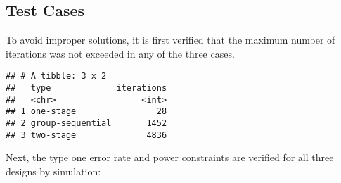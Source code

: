 \documentclass[
]{book}
\newenvironment{Shaded}{\begin{snugshade}}{\end{snugshade}}
\newcommand{\DataTypeTok}[1]{\textcolor[rgb]{0.13,0.29,0.53}{#1}}
\newcommand{\KeywordTok}[1]{\textcolor[rgb]{0.13,0.29,0.53}{\textbf{#1}}}
\newcommand{\NormalTok}[1]{#1}
\newcommand{\OperatorTok}[1]{\textcolor[rgb]{0.81,0.36,0.00}{\textbf{#1}}}
\newcommand{\StringTok}[1]{\textcolor[rgb]{0.31,0.60,0.02}{#1}}
\begin{document}
\hypertarget{test-cases-14}{%
\subsection{Test Cases}\label{test-cases-14}}

To avoid improper solutions, it is first verified that the maximum
number of iterations was not exceeded in any of the three cases.

\begin{Shaded}
\end{Shaded}

\begin{verbatim}
## # A tibble: 3 x 2
##   type             iterations
##   <chr>                 <int>
## 1 one-stage                28
## 2 group-sequential       1452
## 3 two-stage              4836
\end{verbatim}

Next, the type one error rate and power constraints are verified
for all three designs by simulation:
\end{document}

